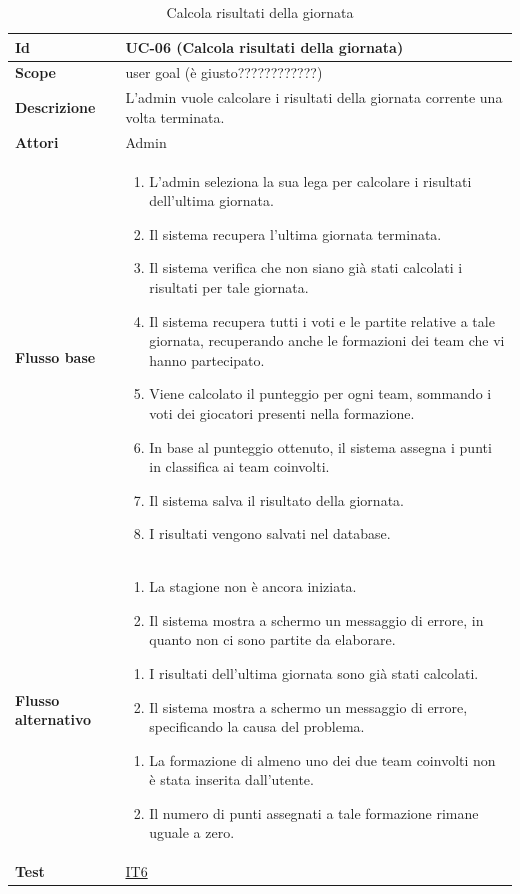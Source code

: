 \begin{table}[H]
\caption{Calcola risultati della giornata}
\label{UC-06}

\begin{tabularx}{\textwidth}{|l|X|}
\hline
\textbf{Id} & UC-06 (Calcola risultati della giornata) \\
\hline
\textbf{Scope} & user goal (è giusto????????????) \\
\hline
\textbf{Descrizione} & L'admin vuole calcolare i risultati della giornata corrente una volta terminata. \\
\hline
\textbf{Attori} & Admin \\
\hline
\textbf{Flusso base} &
\begin{enumerate}[leftmargin=*]
    \item L'admin seleziona la sua lega per calcolare i risultati dell'ultima giornata.
    \item Il sistema recupera l'ultima giornata terminata.
    \item Il sistema verifica che non siano già stati calcolati i risultati per tale giornata.
    \item Il sistema recupera tutti i voti e le partite relative a tale giornata, recuperando 
        anche le formazioni dei team che vi hanno partecipato.
    \item Viene calcolato il punteggio per ogni team, sommando i voti dei giocatori presenti nella formazione.
    \item In base al punteggio ottenuto, il sistema assegna i punti in classifica ai team coinvolti.
    \item Il sistema salva il risultato della giornata.

    \item I risultati vengono salvati nel database.
\end{enumerate} \\
\hline
\textbf{Flusso alternativo} &
\begin{enumerate}[leftmargin=*,label=1.\arabic*]
    \item La stagione non è ancora iniziata.
    \item Il sistema mostra a schermo un messaggio di errore, in quanto non ci sono partite da elaborare.
\end{enumerate}
\begin{enumerate}[leftmargin=*,label=3.\arabic*]
    \item I risultati dell'ultima giornata sono già stati calcolati.
    \item Il sistema mostra a schermo un messaggio di errore, specificando la causa del problema.
\end{enumerate}
\begin{enumerate}[leftmargin=*,label=4.\arabic*]
    \item La formazione di almeno uno dei due team coinvolti non è stata inserita dall'utente.
    \item Il numero di punti assegnati a tale formazione rimane uguale a zero.
\end{enumerate} \\
\hline
\textbf{Test} & \hyperref[IT6]{IT6} \\
\hline
\end{tabularx}


\end{table}
